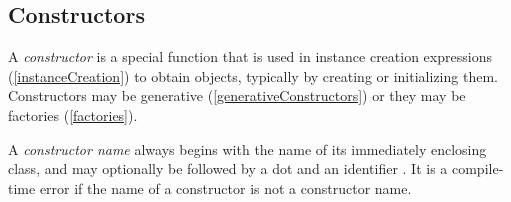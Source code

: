 \documentclass{article}
\begin{document}








\subsection{Constructors}

\LMHash{}
A {\em constructor} is a special function that is used in instance creation expressions (\ref{instanceCreation}) to obtain objects, typically by creating or initializing them.
Constructors may be generative (\ref{generativeConstructors}) or they may be factories (\ref{factories}).

\LMHash{}
A {\em constructor name} always begins with the name of its immediately enclosing class, and may optionally be followed by a dot and an identifier \id.
It is a compile-time error if the name of a constructor is not a constructor name.



\end{document}
